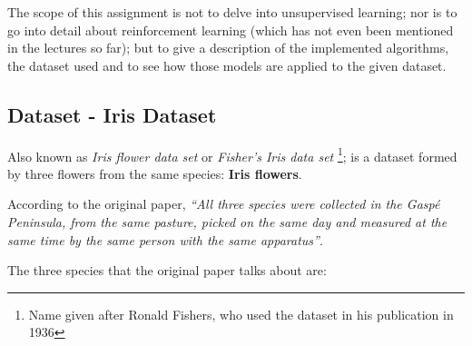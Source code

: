 \documentclass[11pt]{article}
\begin{document}
The scope of this assignment is not to delve into unsupervised learning; nor is
to go into detail about reinforcement learning (which has not even been 
mentioned in the lectures so far); but to give a description of the implemented
algorithms, the dataset used and to see how those models are applied to the
given dataset.

\subsection{Dataset - Iris Dataset}

Also known as \textit{Iris flower data set} or \textit{Fisher's Iris data set}
\footnote{Name given after Ronald Fishers, who used the dataset in his 
publication in 1936}; is a dataset formed by three flowers from the same 
species: \textbf{Iris flowers}.

According to the original paper, \textit{``All three species were collected in
the Gaspé Peninsula, from the same pasture, picked on the same day and measured
at the same time by the same person with the same apparatus''}.

The three species that the original paper talks about are:
\end{document}
